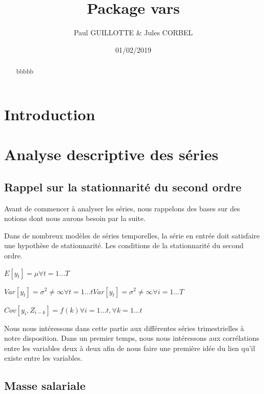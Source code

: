 \documentclass[11pt,]{article}
\title{Package vars}
\author{Paul GUILLOTTE \& Jules CORBEL}
\date{01/02/2019}
\begin{document}
\maketitle
\begin{abstract}
bbbbb
\end{abstract}

{
\setcounter{tocdepth}{2}
\tableofcontents
}
\section*{Introduction}\label{introduction}

\section{Analyse descriptive des
séries}\label{analyse-descriptive-des-series}

\subsection{Rappel sur la stationnarité du second
ordre}\label{rappel-sur-la-stationnarite-du-second-ordre}

Avant de commencer à analyser les séries, nous rappelons des bases sur
des notions dont nous aurons besoin par la suite.

Dans de nombreux modèles de séries temporelles, la série en entrée doit
satisfaire une hypothèse de stationnarité. Les conditions de la
stationnarité du second ordre.

\(E[y_{t}]=\mu \forall t=1...T\)

\(Var[y_{t}]=\sigma ^{2}\neq \infty \forall t=1...t Var[y_{t}]=\sigma ^{2}\neq \infty \forall i=1...T\)

\(Cov[y_{i},Z_{i-k}]=f(k) \forall i=1...t, \forall k=1...t\)

Nous nous intéressons dans cette partie aux différentes séries
trimestrielles à notre disposition. Dans un premier temps, nous nous
intéressons aux corrélations entre les variables deux à deux afin de
nous faire une première idée du lien qu'il existe entre les variables.

\subsection{\texorpdfstring{Masse salariale
\label{MSE}}{Masse salariale }}\label{masse-salariale}
\end{document}

